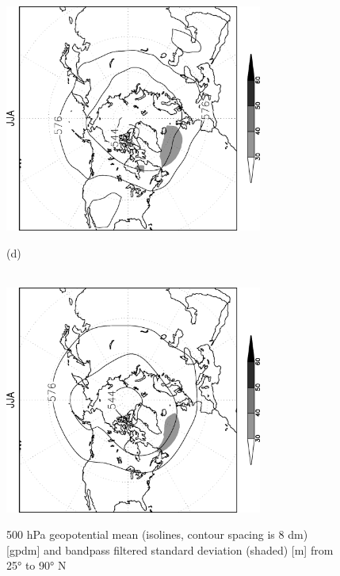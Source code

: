 \documentclass[12pt,a4paper,twoside,openright,headinclude,liststotoc,bibtotoc]{scrreprt}
\begin{document}
\begin{figure}[b]
{\includegraphics[height=7.5cm,angle=-90]
{eps/NHz500StdbpJJA.eps}
}
\parbox{8.5cm}{\hspace{0.02cm}\begin{scriptsize}(d)\end{scriptsize} \vspace{-0.3cm} \\
\includegraphics[height=7.5cm,angle=-90]
{eps/NHt21z500StdbpJJA.eps}
}
\caption[Northern Hemisphere 500 hPa geopotential mean and bandpass filtered standard deviation]{500 hPa geopotential mean (isolines, contour spacing is 8 dm) [gpdm] and bandpass filtered standard deviation (shaded) [m] from 25° to 90° N}
\label{img:z500N}
\end{figure}
\end{document}
